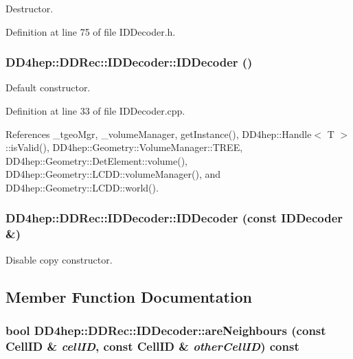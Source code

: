 Destructor. 

Definition at line 75 of file IDDecoder.h.\hypertarget{class_d_d4hep_1_1_d_d_rec_1_1_i_d_decoder_af0d078d2fd6039aadb63d113b7a83367}{
\subsubsection[{IDDecoder}]{\setlength{\rightskip}{0pt plus 5cm}DD4hep::DDRec::IDDecoder::IDDecoder ()}}
\label{class_d_d4hep_1_1_d_d_rec_1_1_i_d_decoder_af0d078d2fd6039aadb63d113b7a83367}


Default constructor. 

Definition at line 33 of file IDDecoder.cpp.

References \_\-tgeoMgr, \_\-volumeManager, getInstance(), DD4hep::Handle$<$ T $>$::isValid(), DD4hep::Geometry::VolumeManager::TREE, DD4hep::Geometry::DetElement::volume(), DD4hep::Geometry::LCDD::volumeManager(), and DD4hep::Geometry::LCDD::world().\hypertarget{class_d_d4hep_1_1_d_d_rec_1_1_i_d_decoder_a428873f9f3597175d44b1e150ebf84e8}{
\subsubsection[{IDDecoder}]{\setlength{\rightskip}{0pt plus 5cm}DD4hep::DDRec::IDDecoder::IDDecoder (const {\bf IDDecoder} \&)}}
\label{class_d_d4hep_1_1_d_d_rec_1_1_i_d_decoder_a428873f9f3597175d44b1e150ebf84e8}


Disable copy constructor. 

\subsection{Member Function Documentation}
\hypertarget{class_d_d4hep_1_1_d_d_rec_1_1_i_d_decoder_af88688b8d23dd00a82a7b5c938cb2cb8}{
\subsubsection[{areNeighbours}]{\setlength{\rightskip}{0pt plus 5cm}bool DD4hep::DDRec::IDDecoder::areNeighbours (const {\bf CellID} \& {\em cellID}, \/  const {\bf CellID} \& {\em otherCellID}) const}}
\label{class_d_d4hep_1_1_d_d_rec_1_1_i_d_decoder_af88688b8d23dd00a82a7b5c938cb2cb8}


